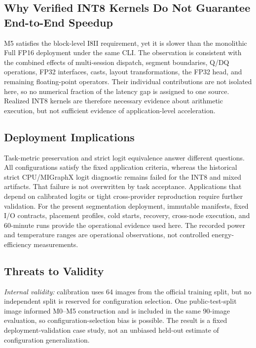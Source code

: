 \documentclass[conference]{IEEEtran}
\begin{document}
\subsection{Why Verified INT8 Kernels Do Not Guarantee End-to-End Speedup}

M5 satisfies the block-level I8II requirement, yet it is slower than the monolithic Full FP16 deployment under the same CLI. The observation is consistent with the combined effects of multi-session dispatch, segment boundaries, Q/DQ operations, FP32 interfaces, casts, layout transformations, the FP32 head, and remaining floating-point operators. Their individual contributions are not isolated here, so no numerical fraction of the latency gap is assigned to one source. Realized INT8 kernels are therefore necessary evidence about arithmetic execution, but not sufficient evidence of application-level acceleration.

\subsection{Deployment Implications}

Task-metric preservation and strict logit equivalence answer different questions. All configurations satisfy the fixed application criteria, whereas the historical strict CPU/MIGraphX logit diagnostic remains failed for the INT8 and mixed artifacts. That failure is not overwritten by task acceptance. Applications that depend on calibrated logits or tight cross-provider reproduction require further validation. For the present segmentation deployment, immutable manifests, fixed I/O contracts, placement profiles, cold starts, recovery, cross-node execution, and 60-minute runs provide the operational evidence used here. The recorded power and temperature ranges are operational observations, not controlled energy-efficiency measurements.

\subsection{Threats to Validity}

\textit{Internal validity:} calibration uses 64 images from the official training split, but no independent split is reserved for configuration selection. One public-test-split image informed M0--M5 construction and is included in the same 90-image evaluation, so configuration-selection bias is possible. The result is a fixed deployment-validation case study, not an unbiased held-out estimate of configuration generalization.
\end{document}
